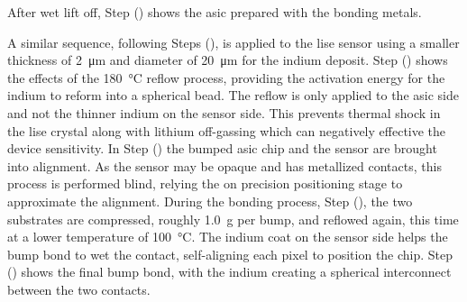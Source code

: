 \documentclass[../../main.tex]{subfiles}
\begin{document}
    After wet lift off, Step () shows the \gls{asic} prepared with the bonding metals.
    \par%
    A similar sequence, following Steps (), is applied to the \gls{lise} sensor using a smaller thickness of \SI{2}{\micro\meter} and diameter of \SI{20}{\micro\meter} for the indium deposit.
    Step () shows the effects of the \SI{180}{\celsius} reflow process, providing the activation energy for the indium to reform into a spherical bead. 
    The reflow is only applied to the \gls{asic} side and not the thinner indium on the sensor side.
    This prevents thermal shock in the \gls{lise} crystal along with lithium off-gassing which can negatively effective the device sensitivity.
    In Step () the bumped \gls{asic} chip and the sensor are brought into alignment.
    As the sensor may be opaque and has metallized contacts, this process is performed blind, relying the on precision positioning stage to approximate the alignment.
    During the bonding process, Step (), the two substrates are compressed, roughly \SI{1.0}{\gram} per bump, and reflowed again, this time at a lower temperature of \SI{100}{\celsius}.
    The indium coat on the sensor side helps the bump bond to wet the contact, self-aligning each pixel to position the chip.
    Step () shows the final bump bond, with the indium creating a spherical interconnect between the two contacts. 
\end{document}
